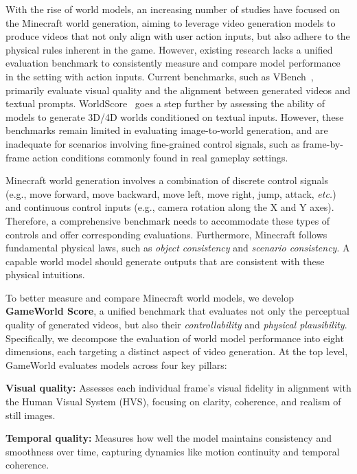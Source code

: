 \documentclass{article}
\def\etc{\emph{etc.}}
\begin{document}
With the rise of world models, an increasing number of studies have focused on the Minecraft world generation, aiming to leverage video generation models to produce videos that not only align with user action inputs, but also adhere to the physical rules inherent in the game. However, existing research lacks a unified evaluation benchmark to consistently measure and compare model performance in the setting with action inputs. Current benchmarks, such as VBench~\cite{huang2024vbench}, primarily evaluate visual quality and the alignment between generated videos and textual prompts. {WorldScore}~\cite{duan2025worldscore} goes a step further by assessing the ability of models to generate 3D/4D worlds conditioned on textual inputs. However, these benchmarks remain limited in evaluating image-to-world generation, and are inadequate for scenarios involving fine-grained control signals, such as frame-by-frame action conditions commonly found in real gameplay settings.

Minecraft world generation involves a combination of {discrete control signals} (e.g., move forward, move backward, move left, move right, jump, attack, \etc) and {continuous control inputs} (e.g., camera rotation along the X and Y axes). Therefore, a comprehensive benchmark needs to accommodate these types of controls and offer corresponding evaluations. Furthermore, Minecraft follows fundamental physical laws, such as  \textit{object consistency} and \textit{scenario consistency}. A capable world model should generate outputs that are consistent with these physical intuitions.

To better measure and compare Minecraft world models, we develop \textbf{GameWorld Score}, a unified benchmark that evaluates not only the perceptual quality of generated videos, but also their \textit{controllability} and \textit{physical plausibility}. Specifically, we decompose the evaluation of world model performance into {eight dimensions}, each targeting a distinct aspect of video generation. At the top level, GameWorld evaluates models across four key pillars:



\textbf{Visual quality:} Assesses each individual frame's visual fidelity in alignment with the Human Visual System (HVS), focusing on clarity, coherence, and realism of still images.

\textbf{Temporal quality:} Measures how well the model maintains consistency and smoothness over time, capturing dynamics like motion continuity and temporal coherence.
\end{document}
